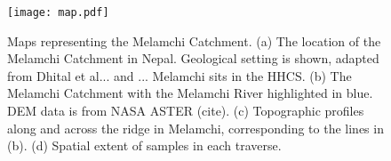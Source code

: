 \FloatBarrier

\begin{figure}[h]
    \centering
    \texttt{[image: map.pdf]}
    \caption{Maps representing the Melamchi Catchment. (a) The location of the Melamchi Catchment in Nepal. Geological setting is shown, adapted from Dhital et al... and ... Melamchi sits in the HHCS. (b) The Melamchi Catchment with the Melamchi River highlighted in blue. DEM data is from NASA ASTER (cite). (c) Topographic profiles along and across the ridge in Melamchi, corresponding to the lines in (b). (d) Spatial extent of samples in each traverse.}
    \label{fig:map}
\end{figure}

\FloatBarrier















